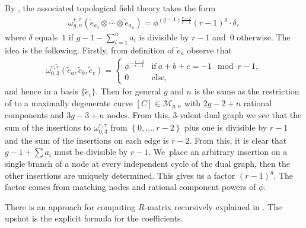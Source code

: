\documentclass[10pt,a4paper]{amsart}
\def\oM{\overline{\mathcal{M}}}
\numberwithin{equation}{section}
\begin{document}
By \cite[Proposition 4.2]{PPZ16}, the associated topological field theory takes the form
 \begin{align}
 \label{top}
\omega^{r,\widetilde{\tau}}_{g,n} (\widetilde{e}_{a_1}\otimes \cdots \otimes \widetilde{e}_{a_n})
= \phi^{(g-1)\frac{r-2}{r-1}}(r-1)^g \cdot \delta ,
\end{align}
where $\delta$ equals~$1$ if $g-1-\sum_{i=1}^n a_i$ is divisible by $r-1$ and~$0$ otherwise.
The idea is the following. Firstly, from definition of $\widetilde{e}_a$ observe that
\begin{align*}
\omega^{r,\widetilde{\tau}}_{0,3}(\widetilde{e}_{a},\widetilde{e}_{b},\widetilde{e}_{c}) =
\begin{cases}
\phi^{-\frac{r-2}{r-1}} & \text{if} \ a+b+c =-1 \mod r-1 ,\\
0 & \text{else},
\end{cases}
\end{align*}
and hence  in a basis $\{\tilde{e}_i\}$.
Then  for general $g$ and $n$ is the same as the restriction of  to a maximally degenerate curve $[C]\in \oM_{g,n}$ with $2g-2+n$ rational components and $3g-3+n$ nodes.
From this, 3-valent dual graph we see that the sum of the insertions to $\omega^{r,\widetilde{\tau}}_{0,3}$ from $\left\{0,\dots,r-2\right\}$ plus one is divisible by $r-1$ and the sum of the insertions on each edge is $r-2$. From this, it is clear that $g-1+\sum a_i$ must be divisible by
$r-1$. We~place an arbitrary insertion on a single branch of a node at every independent cycle of the dual graph, then the other insertions are uniquely determined. This gives us a factor $(r-1)^g$. The factor  comes from matching nodes and
rational component powers of $\phi$.

There is an approach for computing $R$-matrix recursively explained in \cite[Proposition~4.4]{PPZ16}. The upshot is the explicit formula for the coefficients.
\end{document}
